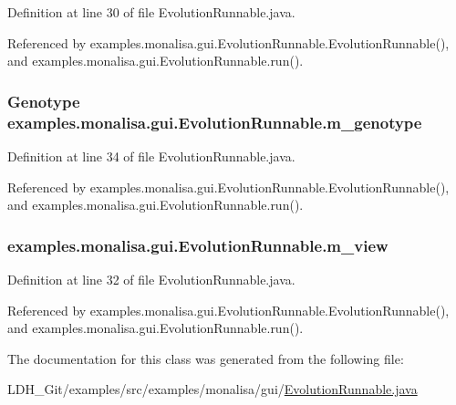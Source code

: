 Definition at line 30 of file Evolution\-Runnable.\-java.



Referenced by examples.\-monalisa.\-gui.\-Evolution\-Runnable.\-Evolution\-Runnable(), and examples.\-monalisa.\-gui.\-Evolution\-Runnable.\-run().

\hypertarget{classexamples_1_1monalisa_1_1gui_1_1_evolution_runnable_a95b4c7b67895cfdd21c0f2645d106b68}{
\subsubsection[{m\-\_\-genotype}]{\setlength{\rightskip}{0pt plus 5cm}Genotype examples.\-monalisa.\-gui.\-Evolution\-Runnable.\-m\-\_\-genotype\hspace{0.3cm}{\ttfamily [private]}}}\label{classexamples_1_1monalisa_1_1gui_1_1_evolution_runnable_a95b4c7b67895cfdd21c0f2645d106b68}


Definition at line 34 of file Evolution\-Runnable.\-java.



Referenced by examples.\-monalisa.\-gui.\-Evolution\-Runnable.\-Evolution\-Runnable(), and examples.\-monalisa.\-gui.\-Evolution\-Runnable.\-run().

\hypertarget{classexamples_1_1monalisa_1_1gui_1_1_evolution_runnable_a0004454131bb24d61ca55127839d699d}{
\subsubsection[{m\-\_\-view}]{ examples.\-monalisa.\-gui.\-Evolution\-Runnable.\-m\-\_\-view\hspace{0.3cm}{\ttfamily [private]}}}\label{classexamples_1_1monalisa_1_1gui_1_1_evolution_runnable_a0004454131bb24d61ca55127839d699d}


Definition at line 32 of file Evolution\-Runnable.\-java.



Referenced by examples.\-monalisa.\-gui.\-Evolution\-Runnable.\-Evolution\-Runnable(), and examples.\-monalisa.\-gui.\-Evolution\-Runnable.\-run().



The documentation for this class was generated from the following file\-:\begin{DoxyCompactItemize}
\item 
L\-D\-H\-\_\-\-Git/examples/src/examples/monalisa/gui/\hyperlink{monalisa_2gui_2_evolution_runnable_8java}{Evolution\-Runnable.\-java}\end{DoxyCompactItemize}
